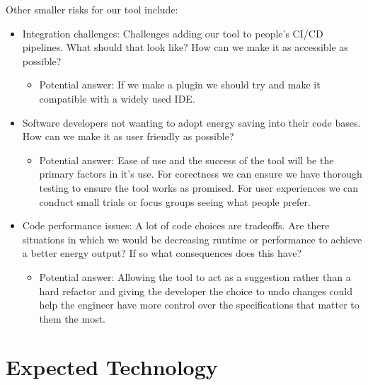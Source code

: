 \documentclass{article}
\begin{document}
Other smaller risks for our tool include:
\begin{itemize}
  \item Integration challenges: Challenges adding our tool to people's CI/CD pipelines. What should that look like? How can we make it as accessible as possible? 
  \begin{itemize}
    \item Potential answer: If we make a plugin we should try and make it compatible with a widely used IDE.
  \end{itemize} 
  \item Software developers not wanting to adopt energy saving into their code bases. How can we make it as user friendly as possible?
  \begin{itemize}
    \item Potential answer: Ease of use and the success of the tool will be the primary factors in it's use. For corectness we can ensure we have thorough testing to ensure the tool works as promised. For user experiences we can conduct small trials or focus groups seeing what people prefer.  
  \end{itemize} 
  \item Code performance issues: A lot of code choices are tradeoffs. Are there situations in which we would be decreasing runtime or performance to achieve a better energy output? If so what consequences does this have?
  \begin{itemize}
    \item Potential answer: Allowing the tool to act as a suggestion rather than a hard refactor and giving the developer the choice to undo changes could help the engineer have more control over the specifications that matter to them the most. 
  \end{itemize} 
\end{itemize} 

\section{Expected Technology}

\end{document}
